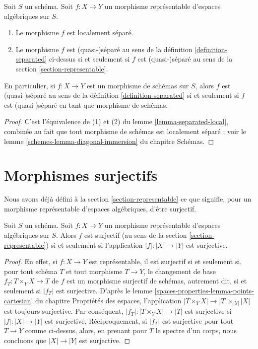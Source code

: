 \begin{lemma}
\label{lemma-match-separated}
Soit $S$ un schéma.
Soit $f : X \to Y$ un morphisme représentable d'espaces algébriques sur $S$.
\begin{enumerate}
\item Le morphisme $f$ est localement séparé.
\item Le morphisme $f$ est (quasi-)séparé au sens de la
définition \ref{definition-separated}
ci-dessus si et seulement si $f$ est (quasi-)séparé au sens de la
section \ref{section-representable}.
\end{enumerate}
En particulier, si $f : X \to Y$ est un morphisme de schémas sur $S$, alors
$f$ est (quasi-)séparé au sens de la
définition \ref{definition-separated}
si et seulement si $f$ est (quasi-)séparé en tant que morphisme de schémas.
\end{lemma}

\begin{proof}
C'est l'équivalence de (1) et (2) du
lemme \ref{lemma-separated-local},
combinée au fait que tout morphisme de schémas est localement séparé ; voir le
lemme \ref{schemes-lemma-diagonal-immersion} du chapitre Schémas.
\end{proof}











\section{Morphismes surjectifs}
\label{section-surjective}

\noindent
Nous avons déjà défini à la section \ref{section-representable}
ce que signifie, pour un morphisme représentable d'espaces algébriques,
d'être surjectif.

\begin{lemma}
\label{lemma-surjective-representable}
Soit $S$ un schéma. Soit $f : X \to Y$ un morphisme représentable
d'espaces algébriques sur $S$. Alors
$f$ est surjectif (au sens de la section \ref{section-representable})
si et seulement si l'application $|f| : |X| \to |Y|$ est surjective.
\end{lemma}

\begin{proof}
En effet, si $f : X \to Y$ est représentable, il est surjectif si et seulement si,
pour tout schéma $T$ et tout morphisme $T \to Y$, le changement de base
$f_T : T \times_Y X \to T$ de $f$ est un morphisme surjectif de schémas,
autrement dit, si et seulement si $|f_T|$ est surjective. D'après le
lemme \ref{spaces-properties-lemma-points-cartesian} du chapitre Propriétés des espaces,
l'application $|T \times_Y X| \to |T| \times_{|Y|} |X|$ est toujours surjective.
Par conséquent, $|f_T| : |T \times_Y X| \to |T|$ est surjective si $|f| : |X| \to |Y|$
est surjective. Réciproquement, si $|f_T|$ est surjective
pour tout $T \to Y$ comme ci-dessus, alors, en prenant pour $T$ le spectre d'un
corps, nous concluons que $|X| \to |Y|$ est surjective.
\end{proof}

